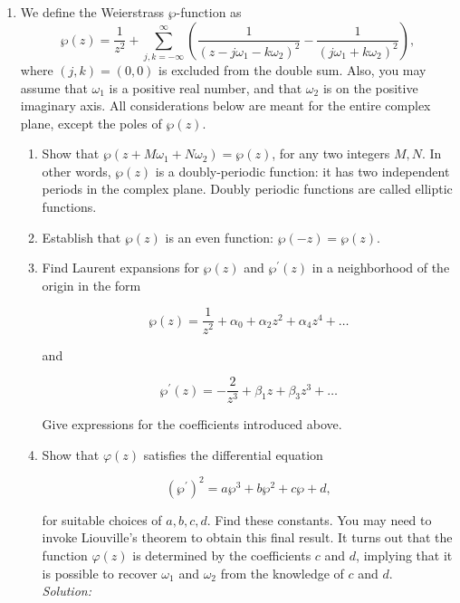 \documentclass[10pt]{amsart}
\theoremstyle{nonumberplain}
\begin{document}
\begin{enumerate}[label={\bf {\arabic*}:}]
\item We define the Weierstrass $\wp$-function as
$$
\wp(z)=\frac{1}{z^2}+\sum_{j, k=-\infty}^{\infty}\left(\frac{1}{\left(z-j \omega_1-k \omega_2\right)^2}-\frac{1}{\left(j \omega_1+k \omega_2\right)^2}\right),
$$
where $(j, k)=(0,0)$ is excluded from the double sum. Also, you may
assume that $\omega_1$ is a positive real number, and that $\omega_2$
is on the positive imaginary axis. All considerations below are meant
for the entire complex plane, except the poles of $\wp(z)$.
\begin{enumerate}
\item Show that $\wp\left(z+M \omega_1+N \omega_2\right)=\wp(z)$, for any two integers $M, N$. In other words, $\wp(z)$ is a doubly-periodic function: it has two independent periods in the complex plane. Doubly periodic functions are called elliptic functions.
\item Establish that $\wp(z)$ is an even function: $\wp(-z)=\wp(z)$.
\item Find Laurent expansions for $\wp(z)$ and $\wp^{\prime}(z)$ in a neighborhood of the origin in the form

$$
\wp(z)=\frac{1}{z^2}+\alpha_0+\alpha_2 z^2+\alpha_4 z^4+\ldots
$$

and

$$
\wp^{\prime}(z)=-\frac{2}{z^3}+\beta_1 z+\beta_3 z^3+\ldots
$$


Give expressions for the coefficients introduced above.
\item Show that $\varphi(z)$ satisfies the differential equation

$$
\left(\wp^{\prime}\right)^2=a \wp^3+b \wp^2+c \wp+d,
$$

for suitable choices of $a, b, c, d$. Find these constants. You may need to invoke Liouville's theorem to obtain this final result. It turns out that the function $\varphi(z)$ is determined by the coefficients $c$ and $d$, implying that it is possible to recover $\omega_1$ and $\omega_2$ from the knowledge of $c$ and $d$. \\
\textit{Solution:} \\

\end{enumerate}
\end{enumerate}
\end{document}
